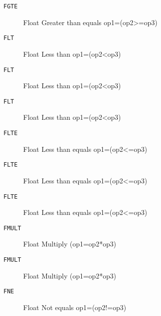 \begin{description}
\item[\texttt{FGTE}]  Float Greater than equals op1=(op2>=op3)\\

\end{description}
\begin{description}
\item[\texttt{FLT}]  Float Less than op1=(op2<op3)\\

\end{description}
\begin{description}
\item[\texttt{FLT}]  Float Less than op1=(op2<op3)\\

\end{description}
\begin{description}
\item[\texttt{FLT}]  Float Less than op1=(op2<op3)\\

\end{description}
\begin{description}
\item[\texttt{FLTE}]  Float Less than equals op1=(op2<=op3)\\

\end{description}
\begin{description}
\item[\texttt{FLTE}]  Float Less than equals op1=(op2<=op3)\\

\end{description}
\begin{description}
\item[\texttt{FLTE}]  Float Less than equals op1=(op2<=op3)\\

\end{description}
\begin{description}
\item[\texttt{FMULT}]  Float Multiply (op1=op2*op3)\\

\end{description}
\begin{description}
\item[\texttt{FMULT}]  Float Multiply (op1=op2*op3)\\

\end{description}
\begin{description}
\item[\texttt{FNE}]  Float Not equals op1=(op2!=op3)\\

\end{description}
